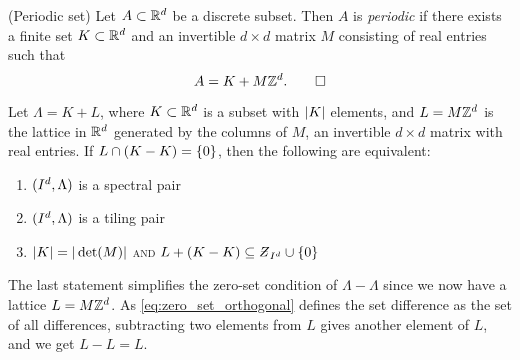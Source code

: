 \documentclass[../thesis.tex]{subfiles}
\begin{document}
\begin{definition}(Periodic set)\label{def:periodic_set}
    Let $A\subset\mathbb{R}^d$ be a discrete subset. Then $A$ is \emph{periodic} if there exists a finite set $K\subset\mathbb{R}^d$ and an invertible $d\times d$ matrix $M$ consisting of real entries such that 
    \begin{equation*}
        A = K + M\mathbb{Z}^d. \qedhere
    \end{equation*}
\end{definition}

\begin{theorem}\label{thrm:periodic_equivalence}
    Let $\Lambda= K + L$, where $K\subset \mathbb{R}^d$ is a subset with $|K|$ elements, and $L=M\mathbb{Z}^d$ is the lattice in $\mathbb{R}^d$ generated by the columns of $M$, an invertible $d\times d$ matrix with real entries. If $L\cap(K-K)= \{0\}$, then the following are equivalent:
    \begin{enumerate}[label=(\roman*), topsep=-3pt]
        \item $(I^d,\Lambda)$ is a spectral pair
        \item $(I^d,\Lambda)$ is a tiling pair  
        \item $|K| = |\det(M)|$ \textsc{and} $L+\brac{K-K}\subseteq \Zstroke_{I^d} \cup \braq{0}$
    \end{enumerate}
\end{theorem}

\begin{remark}
    The last statement simplifies the zero-set condition of $\Lambda-\Lambda$ since we now have a lattice $L=M\mathbb{Z}^d$. As \cref{eq:zero_set_orthogonal}  defines the set difference as the set of all differences, subtracting two elements from $L$ gives another element of $L$, and we get $L-L=L$.
\end{remark}
\end{document}
